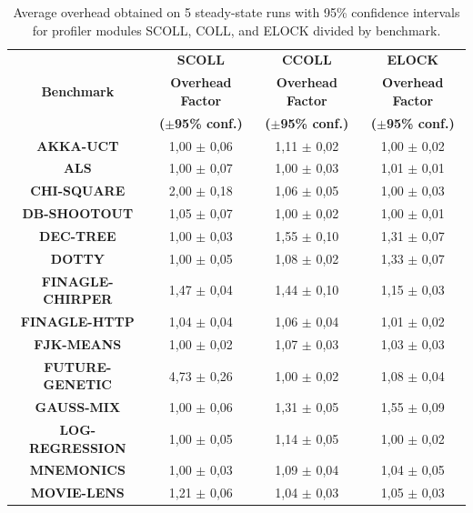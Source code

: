\documentclass[]{usiinfthesis}
\begin{document}
\begin{table}
\centering
\caption{Average overhead obtained on 5 steady-state runs with 95\% confidence intervals for profiler modules SCOLL, COLL, and ELOCK divided by benchmark.}
\begin{tabular}{|c|c|c|c|}
\hline
		 & 	\textbf{	SCOLL	}	 & 	\textbf{	CCOLL	}	 & 	\textbf{	ELOCK	}	\\
\textbf{	Benchmark	}& 	\textbf{	Overhead Factor	}	 & 	\textbf{	Overhead Factor	}	 & 	\textbf{	Overhead Factor	}	\\
&	\textbf{	 ($\pm$95\% conf.) 	}	 & 	\textbf{	 ($\pm$95\% conf.) 	}	 & 	\textbf{	 ($\pm$95\% conf.) 	}	\\

\hline
\textbf{	AKKA-UCT	}&	 1,00 	 $\pm$ 	 0,06 	 & 	 1,11 	 $\pm$ 	 0,02 	 & 	 1,00 	 $\pm$ 	 0,02 	\\
\textbf{	ALS	}&	 1,00 	 $\pm$ 	 0,07 	 & 	 1,00 	 $\pm$ 	 0,03 	 & 	 1,01 	 $\pm$ 	 0,01 	\\
\textbf{	CHI-SQUARE	}&	 2,00 	 $\pm$ 	 0,18 	 & 	 1,06 	 $\pm$ 	 0,05 	 & 	 1,00 	 $\pm$ 	 0,03 	\\
\textbf{	DB-SHOOTOUT	}&	 1,05 	 $\pm$ 	 0,07 	 & 	 1,00 	 $\pm$ 	 0,02 	 & 	 1,00 	 $\pm$ 	 0,01 	\\
\textbf{	DEC-TREE	}&	 1,00 	 $\pm$ 	 0,03 	 & 	 1,55 	 $\pm$ 	 0,10 	 & 	 1,31 	 $\pm$ 	 0,07 	\\
\textbf{	DOTTY	}&	 1,00 	 $\pm$ 	 0,05 	 & 	 1,08 	 $\pm$ 	 0,02 	 & 	 1,33 	 $\pm$ 	 0,07 	\\
\textbf{	FINAGLE-CHIRPER	}&	 1,47 	 $\pm$ 	 0,04 	 & 	 1,44 	 $\pm$ 	 0,10 	 & 	 1,15 	 $\pm$ 	 0,03 	\\
\textbf{	FINAGLE-HTTP	}&	 1,04 	 $\pm$ 	 0,04 	 & 	 1,06 	 $\pm$ 	 0,04 	 & 	 1,01 	 $\pm$ 	 0,02 	\\
\textbf{	FJK-MEANS	}&	 1,00 	 $\pm$ 	 0,02 	 & 	 1,07 	 $\pm$ 	 0,03 	 & 	 1,03 	 $\pm$ 	 0,03 	\\
\textbf{	FUTURE-GENETIC	}&	 4,73 	 $\pm$ 	 0,26 	 & 	 1,00 	 $\pm$ 	 0,02 	 & 	 1,08 	 $\pm$ 	 0,04 	\\
\textbf{	GAUSS-MIX	}&	 1,00 	 $\pm$ 	 0,06 	 & 	 1,31 	 $\pm$ 	 0,05 	 & 	 1,55 	 $\pm$ 	 0,09 	\\
\textbf{	LOG-REGRESSION	}&	 1,00 	 $\pm$ 	 0,05 	 & 	 1,14 	 $\pm$ 	 0,05 	 & 	 1,00 	 $\pm$ 	 0,02 	\\
\textbf{	MNEMONICS	}&	 1,00 	 $\pm$ 	 0,03 	 & 	 1,09 	 $\pm$ 	 0,04 	 & 	 1,04 	 $\pm$ 	 0,05 	\\
\textbf{	MOVIE-LENS	}&	 1,21 	 $\pm$ 	 0,06 	 & 	 1,04 	 $\pm$ 	 0,03 	 & 	 1,05 	 $\pm$ 	 0,03 	\\

\end{tabular}
\end{table}
\end{document}
